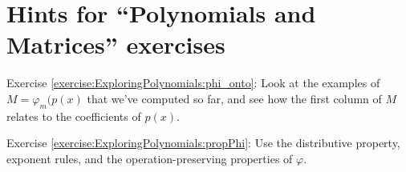 \section{Hints for ``Polynomials and Matrices'' exercises}\label{sec:ExploringPolynomials:Hints} 


\noindent Exercise \ref{exercise:ExploringPolynomials:phi_onto}: Look at the examples of $M=\varphi_m(p(x)$ that we've computed so far, and see how the first column of $M$ relates to the coefficients of $p(x)$.

\noindent Exercise \ref{exercise:ExploringPolynomials:propPhi}:  Use the distributive property, exponent rules, and the operation-preserving properties of $\varphi$.


